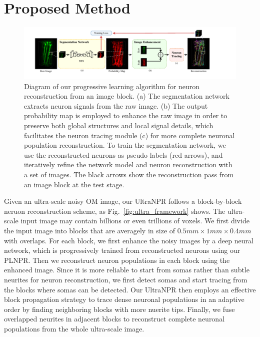 \section{Proposed Method}
\label{sec:method}
\begin{figure}[th]
	\centering
	\includegraphics[width=1\textwidth]{./Illustrations/framework_plnpr.pdf}
	\caption{Diagram of our progressive learning algorithm for neuron reconstruction from an image block. (a) The segmentation network extracts neuron signals from the raw image. (b) The output probability map is employed to enhance the raw image in order to preserve both global structures and local signal details, which facilitates the neuron tracing module (c) for more complete neuronal population reconstruction. To train the segmentation network, we use the reconstructed neurons as pseudo labels (red arrows), and iteratively refine the network model and neuron reconstruction with a set of images. The black arrows show the reconstruction pass from an image block at the test stage.}
	\label{fig:framework}
\end{figure}


Given an ultra-scale noisy OM image, our UltraNPR follows a block-by-block neruon reconstruction scheme, as Fig.~\ref{fig:ultra_framework} shows. 
%
The ultra-scale input image may contain billions or even trillions of voxels.
We first divide the input image into blocks that are averagely in size of $0.5mm\times 1mm\times 0.4mm$ with overlaps. 
%
For each block, we first enhance the noisy images by a deep neural network, which is progressively trained from reconstructed neurons using our PLNPR. 
Then we reconstruct neuron populations in each block using the enhanced image. 
%
Since it is more reliable to start from somas rather than subtle neurites for neuron reconstruction, we first detect somas and start tracing from the blocks where somas can be detected. 
%
Our UltraNPR then employs an effective block propagation strategy to trace dense neuronal populations in an adaptive order by finding neighboring blocks with more nuerite tips. 
Finally, we fuse overlapped neurites in adjacent blocks to reconstruct complete neuronal populations from the whole ultra-scale image.


